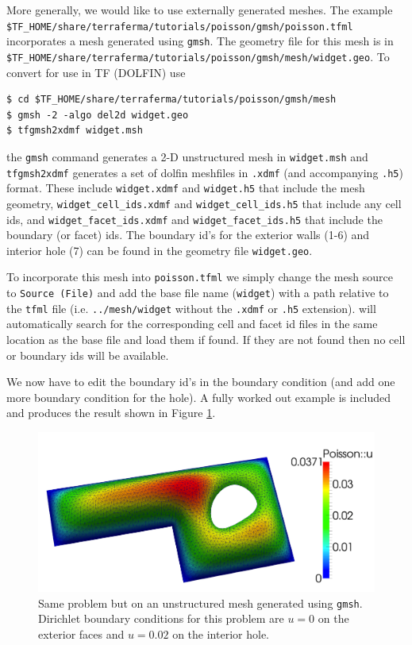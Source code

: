 More generally, we would like to use externally generated meshes.  The
example \texttt{\$TF\_HOME/share/terraferma/tutorials/poisson/gmsh/poisson.tfml}
incorporates a mesh generated using \texttt{gmsh}.  The geometry file
for this mesh is in
\texttt{\$TF\_HOME/share/terraferma/tutorials/poisson/gmsh/mesh/widget.geo}. To convert
for use in TF (DOLFIN) use
\begin{lstlisting}[style=Bash]
$ cd $TF_HOME/share/terraferma/tutorials/poisson/gmsh/mesh
$ gmsh -2 -algo del2d widget.geo
$ tfgmsh2xdmf widget.msh
\end{lstlisting}
the \texttt{gmsh} command generates a 2-D unstructured mesh in
\texttt{widget.msh} and  \texttt{tfgmsh2xdmf} generates a set of dolfin
meshfiles in \texttt{.xdmf} (and accompanying \texttt{.h5}) format.  
These include \texttt{widget.xdmf} and \texttt{widget.h5}  that include the mesh geometry,
\texttt{widget\_cell\_ids.xdmf} and \texttt{widget\_cell\_ids.h5} that include any cell ids, and
\texttt{widget\_facet\_ids.xdmf} and \texttt{widget\_facet\_ids.h5} that include the boundary 
(or facet) ids.  The boundary id's for the
exterior walls (1-6) and interior hole (7) can be found in the geometry file
\texttt{widget.geo}.

To incorporate this mesh into \texttt{poisson.tfml} we simply change
the mesh source to \texttt{Source (File)} and add the base file name (\texttt{widget})
with a path relative to the \texttt{tfml} file (i.e. \texttt{../mesh/widget}
without the \texttt{.xdmf} or \texttt{.h5} extension).  \TF{} will automatically search
for the corresponding cell and facet id files in the same location as the base file
and load them if found.  If they are not found then no cell or boundary ids will be available.

We now have to edit the
boundary id's in the boundary condition (and add one more boundary
condition for the hole).  A fully worked out example is included and
produces the result shown in Figure \ref{fig:poisson_gmsh}.
\begin{figure}[h!]
  \centering
\includegraphics[width=.8\textwidth]{figures/poisson_simple_gmsh}
  \caption{\small Same problem but on an unstructured mesh generated using
    \texttt{gmsh}. Dirichlet boundary conditions for this problem are $u=0$ on
    the exterior faces and $u=0.02$ on the interior hole. }
\label{fig:poisson_gmsh}
\end{figure}

